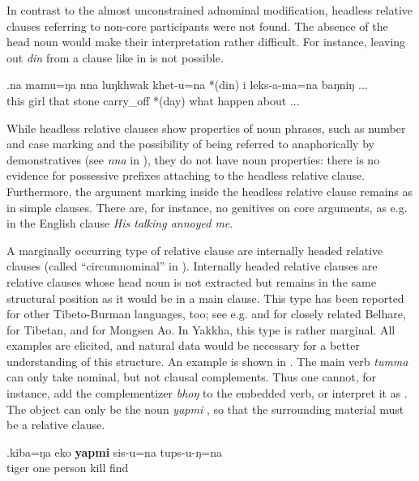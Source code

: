 In contrast to the almost unconstrained adnominal modification, headless relative clauses referring to non-core participants were not found. The absence of the head noun would make their interpretation rather difficult. For instance, leaving out \emph{din}  from a clause like in \Next is not possible. 

\exg.na   mamu=ŋa   nna  luŋkhwak khet-u=na  *(din) i leks-a-ma=na  baŋniŋ ...\\
this girl that stone  carry\_off *(day) what happen about ...\\
 


While headless relative clauses show  properties of noun phrases, such as number and case marking and the possibility of being referred to anaphorically by demonstratives (see \emph{nna} in \LLast[a]), they do not have noun properties: there is  no evidence for possessive prefixes attaching to the headless relative clause. Furthermore, the argument marking inside the headless relative clause remains as in simple clauses. There are, for instance, no genitives on core arguments, as e.g. in the English clause \emph{His talking annoyed me}. 

A marginally occurring type of relative clause are internally headed relative clauses (called “circumnominal” in \citet{Lehmann1984Der-Relativsatz}). Internally headed relative clauses are relative clauses whose head noun is not extracted but remains in the same structural position as it would be in a main clause. This type has been reported for other Tibeto-Burman languages, too; see e.g. \citet[3]{Bickel2005On-the-typological} and \cite{Bickel1999Nominalization} for closely related Belhare, \citet[245]{DeLancey1999Relativization} for Tibetan, and \citet[255]{Coupe2007_Mongsen} for Mongsen Ao. In Yakkha, this type is rather marginal. All examples are elicited, and natural data would be necessary for a better understanding of this structure. An example is shown in \Next. The main verb \emph{tumma}  can only take nominal, but not clausal complements. Thus one cannot, for instance, add the complementizer \emph{bhoŋ} to the embedded verb, or interpret it as . The object can only be the noun \emph{yapmi} , so that the surrounding material must be a relative clause.


\exg.kiba=ŋa  eko \textbf{yapmi} sis-u=na tups-u-ŋ=na\\
tiger one person kill find\\ 


